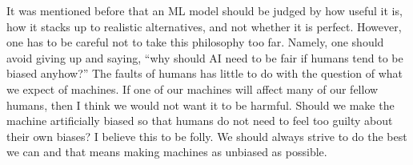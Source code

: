 It was mentioned before that an \ac{ML} model should be judged by how useful it is,
how it stacks up to realistic alternatives, and not whether it is perfect.
However, one has to be careful not to take this philosophy too far.
Namely, one should avoid giving up and saying,
``why should AI need to be fair if humans tend to be biased anyhow?''
The faults of humans has little to do with the question of what we expect of machines.
If one of our machines will affect many of our fellow humans,
then I think we would not want it to be harmful.
Should we make the machine artificially biased
so that humans do not need to feel too guilty about their own biases?
I believe this to be folly.
We should always strive to do the best we can
and that means making machines as unbiased as possible.

